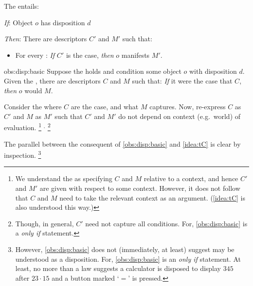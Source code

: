 \begin{note}
  \begin{proposition}%
    \label{obs:disp:basic}%
    The  entails:

    \begin{itenum}
    \item[\emph{If}:]
      Object \(o\) has disposition \(d\)
    \item[\emph{Then}:]
      There are descriptors \(C'\) and \(M'\) such that:
      \begin{itemize}
      \item
        For every :
        \emph{If} \(C'\) is the case, \emph{then} \(o\) manifests \(M'\).
      \end{itemize}
    \end{itenum}
    \vspace{-\baselineskip}
  \end{proposition}

  \begin{argument}{obs:disp:basic}
    Suppose the  holds and condition some object \(o\) with disposition \(d\).
    Given the , there are descriptors \(C\) and \(M\) such that:
    \emph{If} it were the case that \(C\), \emph{then} \(o\) would \(M\).

    Consider the  where \(C\) are the case, and what \(M\) captures.
    Now, re-express \(C\) as \(C'\) and \(M\) as \(M'\) such that \(C'\) and \(M'\) do not depend on context (e.g.\ world) of evaluation.%
    \footnote{
      We understand the \dBCAa{} as specifying \(C\) and \(M\) relative to a context, and hence \(C'\) and \(M'\) are given with respect to some context.
      However, it does not follow that \(C\) and \(M\) need to take the relevant context as an argument.
      (\autoref{idea:tC} is also understood this way.)
    }%
    \(^{,}\)%
    \footnote{
      Though, in general, \(C'\) need not capture all conditions.
      For, \autoref{obs:disp:basic} is a \emph{only if} statement.
    }
  \end{argument}

  \noindent%
  The parallel between the consequent of \autoref{obs:disp:basic} and \autoref{idea:tC} is clear by inspection.%
  \footnote{
    However, \autoref{obs:disp:basic} does not (immediately, at least) suggest \tCV{} may be understood as a disposition.
    For, \autoref{obs:disp:basic} is an \emph{only if} statement.
    At least, no more than a law suggests a calculator is disposed to display \(345\) after \(23 \cdot 15\) and a button marked `\(=\)' is pressed.
  }
\end{note}



